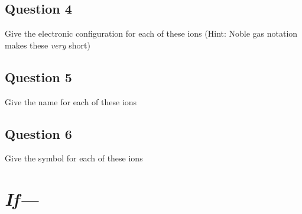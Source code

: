 \documentclass[11pt, letterpaper]{memoir}
\begin{document}
{\subsection*{Question 4}
Give the electronic configuration for each of these ions (Hint: Noble gas notation makes these \emph{very} short)


\vspace{2em}
\subsection*{Question 5}
Give the name for each of these ions 


\vspace{2em}
\subsection*{Question 6}
Give the symbol for each of these ions 


\newpage
{}
\pagestyle{empty}
\addtocounter{page}{-1}
\section*{\emph{If---}}
}
\end{document}
